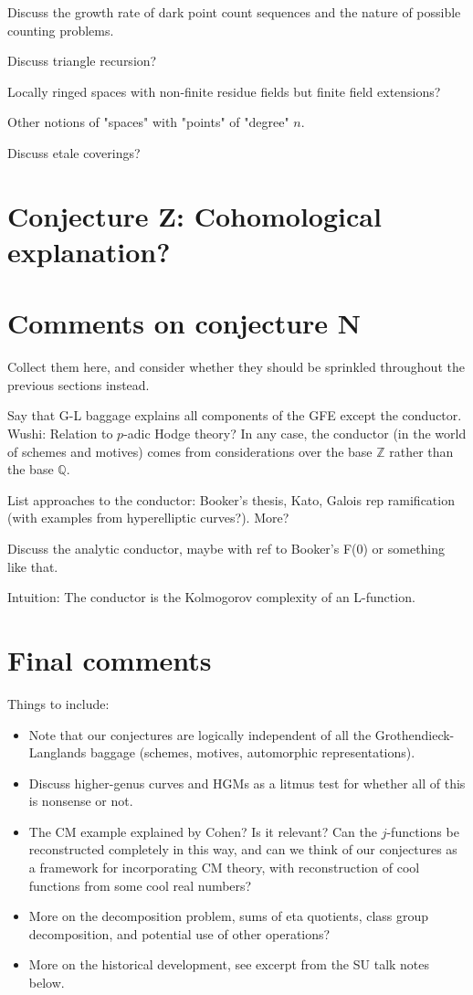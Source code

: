 \documentclass[paper=a4, fontsize=11pt]{scrartcl} %
\numberwithin{equation}{section} %
\numberwithin{figure}{section} %
\numberwithin{table}{section} %
\begin{document}
Discuss the growth rate of dark point count sequences and the nature of possible counting problems.

Discuss triangle recursion?

Locally ringed spaces with non-finite residue fields but finite field extensions?

Other notions of "spaces" with "points" of "degree" $n$.

Discuss etale coverings?

\section{Conjecture Z: Cohomological explanation?}


\section{Comments on conjecture N}

Collect them here, and consider whether they should be sprinkled throughout the previous sections instead.

Say that G-L baggage explains all components of the GFE except the conductor. Wushi: Relation to $p$-adic Hodge theory? In any case, the conductor (in the world of schemes and motives) comes from considerations over the base $\mathbb{Z}$ rather than the base $\mathbb{Q}$.

List approaches to the conductor: Booker's thesis, Kato, Galois rep ramification (with examples from hyperelliptic curves?). More?

Discuss the analytic conductor, maybe with ref to Booker's F(0) or something like that.

Intuition: The conductor is the Kolmogorov complexity of an L-function.

\section{Final comments}

Things to include:
\begin{itemize}
\item Note that our conjectures are logically independent of all the Grothendieck-Langlands baggage (schemes, motives, automorphic representations).
\item Discuss higher-genus curves and HGMs as a litmus test for whether all of this is nonsense or not.
\item The CM example explained by Cohen? Is it relevant? Can the $j$-functions be reconstructed completely in this way, and can we think of our conjectures as a framework for incorporating CM theory, with reconstruction of cool functions from some cool real numbers?
\item More on the decomposition problem, sums of eta quotients, class group decomposition, and potential use of other operations?
\item More on the historical development, see excerpt from the SU talk notes below.
\end{itemize}
\end{document}

